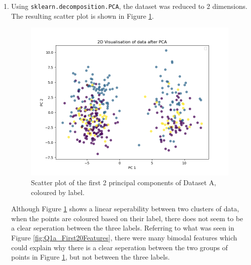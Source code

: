 \documentclass{article}
\begin{document}
\begin{enumerate}[label=\alph*)]
    \item Using \verb|sklearn.decomposition.PCA|, the dataset was reduced to 2 dimensions. The resulting scatter plot is shown in Figure \ref{fig:Q1b_PCA}.
    \begin{figure}[!htb]
        \centering
        \includegraphics[width=\textwidth]{Q1b_PCA.png}
        \caption{Scatter plot of the first 2 principal components of Dataset A, coloured by label.}
        \label{fig:Q1b_PCA}
    \end{figure}
    Although Figure \ref{fig:Q1b_PCA} shows a linear seperability between two clusters of data, when the points are coloured based on their label, there does not seem to be a clear seperation between the three labels. Referring to what was seen in Figure \ref{fig:Q1a_First20Features}, there were many bimodal features which could explain why there is a clear seperation between the two groups of points in Figure \ref{fig:Q1b_PCA}, but not between the three labels.


\end{enumerate}
\end{document}
